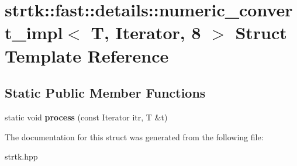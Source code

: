 \hypertarget{structstrtk_1_1fast_1_1details_1_1numeric__convert__impl_3_01T_00_01Iterator_00_018_01_4}{\section{strtk\-:\-:fast\-:\-:details\-:\-:numeric\-\_\-convert\-\_\-impl$<$ T, Iterator, 8 $>$ Struct Template Reference}
\label{structstrtk_1_1fast_1_1details_1_1numeric__convert__impl_3_01T_00_01Iterator_00_018_01_4}
}
\subsection*{Static Public Member Functions}
\begin{DoxyCompactItemize}
\item 
\hypertarget{structstrtk_1_1fast_1_1details_1_1numeric__convert__impl_3_01T_00_01Iterator_00_018_01_4_a6ba75630d504c54bb38d260d839cf06e}{static void {\bfseries process} (const Iterator itr, T \&t)}\label{structstrtk_1_1fast_1_1details_1_1numeric__convert__impl_3_01T_00_01Iterator_00_018_01_4_a6ba75630d504c54bb38d260d839cf06e}

\end{DoxyCompactItemize}


The documentation for this struct was generated from the following file\-:\begin{DoxyCompactItemize}
\item 
strtk.\-hpp\end{DoxyCompactItemize}
